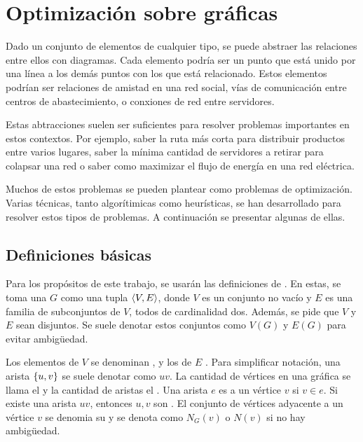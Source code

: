 \chapter{Optimización sobre gráficas}

Dado un conjunto de elementos de cualquier tipo, se puede abstraer las
relaciones entre ellos con diagramas. Cada elemento podría ser un punto que está
unido por una línea a los demás puntos con los que está relacionado. Estos
elementos podrían ser relaciones de amistad en una red social, vías de
comunicación entre centros de abastecimiento, o conxiones de red entre
servidores.

Estas abtracciones suelen ser suficientes para resolver problemas importantes
en estos contextos. Por ejemplo, saber la ruta más corta para distribuir
productos entre varios lugares, saber la mínima cantidad de servidores a retirar
para colapsar una red o saber como maximizar el flujo de energía en una red
eléctrica.

Muchos de estos problemas se pueden plantear como problemas de optimización.
Varias técnicas, tanto algorítimicas como heurísticas, se han desarrollado para
resolver estos tipos de problemas. A continuación se presentar algunas de ellas.

\section{Definiciones básicas}

Para los propósitos de este trabajo, se usarán las definiciones de
\cite{Diestel2017}. En estas, se toma una  $G$ como una tupla
$\langle V, E \rangle$, donde $V$ es un conjunto no vacío y $E$ es una familia de
subconjuntos de $V$, todos de cardinalidad dos. Además, se pide que $V$ y $E$
sean disjuntos. Se suele denotar estos conjuntos como $V(G)$ y $E(G)$ para
evitar ambigüedad.

Los elementos de $V$ se denominan , y los de $E$ .
Para simplificar notación, una arista $\{ u, v \}$ se suele denotar como $uv$.
La cantidad de vértices en una gráfica se llama el  y la cantidad de
aristas el . Una arista $e$ es  a un vértice $v$ si
$v \in e$. Si existe una arista $uv$, entonces $u, v$ son . El
conjunto de vértices adyacente a un vértice $v$ se denomia su  y
se denota como $N_{G}(v)$ o $N(v)$ si no hay ambigüedad.

